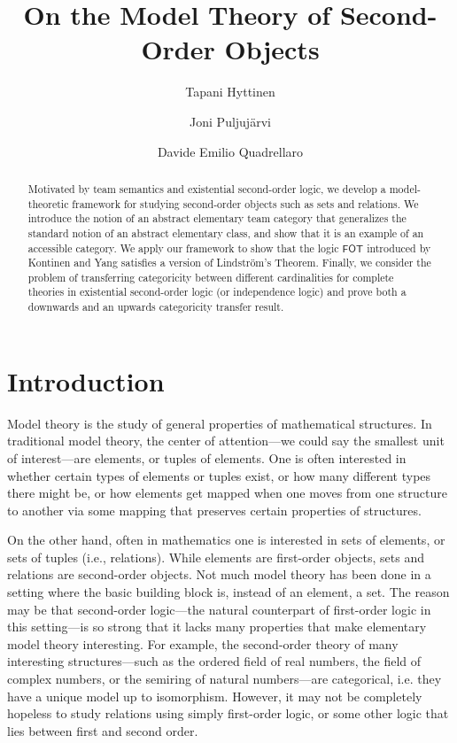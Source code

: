 \documentclass[a4paper]{amsart}
\title{On the Model Theory of Second-Order Objects}
\author[T. Hyttinen]{Tapani Hyttinen}
\author[J. Puljujärvi]{Joni Puljujärvi}
\author[D. E. Quadrellaro]{Davide Emilio Quadrellaro}
\theoremstyle{definition}
\theoremstyle{remark}
\newcommand\fot{\mathsf{FOT}}
\theoremstyle{definition}
\begin{document}
\begin{abstract}
    Motivated by team semantics and existential second-order logic, we develop a model-theoretic framework for studying second-order objects such as sets and relations. We introduce the notion of an abstract elementary team category that generalizes the standard notion of an abstract elementary class, and show that it is an example of an accessible category. We apply our framework to show that the logic $\fot$ introduced by Kontinen and Yang \cite{MR4594292} satisfies a version of Lindström's Theorem. Finally, we consider the problem of transferring categoricity between different cardinalities for complete theories in existential second-order logic (or independence logic) and prove both a downwards and an upwards categoricity transfer result.
\end{abstract}

\maketitle

\setcounter{tocdepth}{1}
\tableofcontents

\section{Introduction}

Model theory is the study of general properties of mathematical structures. In traditional model theory, the center of attention---we could say the smallest unit of interest---are elements, or tuples of elements. One is often interested in whether certain types of elements or tuples exist, or how many different types there might be, or how elements get mapped when one moves from one structure to another via some mapping that preserves certain properties of structures.

On the other hand, often in mathematics one is interested in sets of elements, or sets of tuples (i.e., relations). While elements are first-order objects, sets and relations are second-order objects. Not much model theory has been done in a setting where the basic building block is, instead of an element, a set. The reason may be that second-order logic---the natural counterpart of first-order logic in this setting---is so strong that it lacks many properties that make elementary model theory interesting. For example, the second-order theory of many interesting structures---such as the ordered field of real numbers, the field of complex numbers, or the semiring of natural numbers---are categorical, i.e. they have a unique model up to isomorphism. However, it may not be completely hopeless to study relations using simply first-order logic, or some other logic that lies between first and second order.
\end{document}
